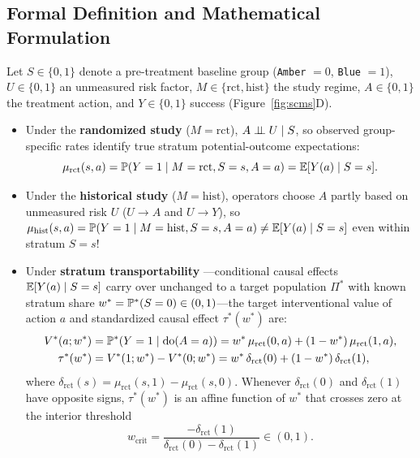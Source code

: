 \subsection{Formal Definition and Mathematical Formulation}
Let $S \in \{0,1\}$ denote a pre-treatment baseline group (\texttt{Amber} $=0$, \texttt{Blue} $=1$), $U \in \{0,1\}$ an unmeasured risk factor, $M \in \{\mathrm{rct}, \mathrm{hist}\}$ the study regime, $A \in \{0,1\}$ the treatment action, and $Y \in \{0,1\}$ success (Figure~\ref{fig:scms}D).
\begin{itemize}
  \item Under the \textbf{randomized study} ($M=\mathrm{rct}$), $A \perp\!\!\!\perp U \mid S$, so observed group-specific rates identify true stratum potential-outcome expectations:
  \begin{equation}
    \mu_{\mathrm{rct}}(s, a) = \mathbb{P}(Y=1 \mid M=\mathrm{rct}, S=s, A=a) = \mathbb{E}[Y(a) \mid S=s].
  \end{equation}
  \item Under the \textbf{historical study} ($M=\mathrm{hist}$), operators choose $A$ partly based on unmeasured risk $U$ ($U \to A$ and $U \to Y$), so $\mu_{\mathrm{hist}}(s, a) = \mathbb{P}(Y=1 \mid M=\mathrm{hist}, S=s, A=a) \neq \mathbb{E}[Y(a) \mid S=s]$ even within stratum $S=s$!
  \item Under \textbf{stratum transportability} \citep{pearl2014external,westreich2017transportability}---conditional causal effects $\mathbb{E}[Y(a)\mid S=s]$ carry over unchanged to a target population $\Pi^*$ with known stratum share $w^* = \mathbb{P}^*(S=0) \in (0,1)$---the target interventional value of action $a$ and standardized causal effect $\tau^*(w^*)$ are:
  \begin{align}
    V^*(a; w^*) &= \mathbb{P}^*(Y=1 \mid \operatorname{do}(A=a)) = w^*\,\mu_{\mathrm{rct}}(0,a) + (1-w^*)\,\mu_{\mathrm{rct}}(1,a), \label{eq:transport_val}\\
    \tau^*(w^*) &= V^*(1; w^*) - V^*(0; w^*) = w^*\,\delta_{\mathrm{rct}}(0) + (1-w^*)\,\delta_{\mathrm{rct}}(1), \label{eq:transport_ate}
  \end{align}
  where $\delta_{\mathrm{rct}}(s) = \mu_{\mathrm{rct}}(s,1) - \mu_{\mathrm{rct}}(s,0)$. Whenever $\delta_{\mathrm{rct}}(0)$ and $\delta_{\mathrm{rct}}(1)$ have opposite signs, $\tau^*(w^*)$ is an affine function of $w^*$ that crosses zero at the interior threshold
  \begin{equation}
    w_{\mathrm{crit}} = \frac{-\delta_{\mathrm{rct}}(1)}{\delta_{\mathrm{rct}}(0) - \delta_{\mathrm{rct}}(1)} \in (0,1).
    \label{eq:w_crit}
  \end{equation}
\end{itemize}

